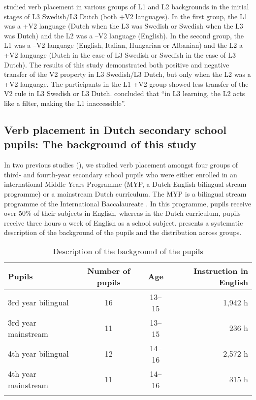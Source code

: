 \documentclass[output=paper]{langsci/langscibook}
\begin{document}
\citet{BardelFalk2007} studied verb placement in various groups of L1 and L2 backgrounds in the initial stages of L3 Swedish/L3 Dutch (both +V2 languages). In the first group, the L1 was a +V2 language (Dutch when the L3 was Swedish or Swedish when the L3 was Dutch) and the L2 was a –V2 language (English). In the second group, the L1 was a –V2 language (English, Italian, Hungarian or Albanian) and the L2 a +V2 language (Dutch in the case of L3 Swedish or Swedish in the case of L3 Dutch). The results of this study demonstrated both positive and negative transfer of the V2 property in L3 Swedish/L3 Dutch, but only when the L2 was a +V2 language. The participants in the L1 +V2 group showed less transfer of the V2 rule in L3 Swedish or L3 Dutch. \citet[480]{BardelFalk2007} concluded that “in L3 learning, the L2 acts like a filter, making the L1 inaccessible”.

\subsection{{Verb} {placement} {in} {Dutch} {secondary} {school} {pupils:} {The} {background} {of} {this} {study}}%
\label{sec:stadt:2.3}

In two previous studies (\citealt{StadtEtAl2016, StadtEtAl2018Exposure}), we studied verb placement amongst four groups of third- and fourth-year secondary school pupils who were either enrolled in an international Middle Years Programme (MYP, a Dutch-English bilingual stream programme) or a mainstream Dutch curriculum. The MYP is a bilingual stream programme of the International Baccalaureate \citep{IBO2019}. In this programme, pupils receive over 50\% of their subjects in English, whereas in the Dutch curriculum, pupils receive three hours a week of English as a school subject.  presents a systematic description of the background of the pupils and the distribution across groups.

\begin{table}
\caption{Description of the background of the pupils\label{tab:stadt:1}}
\begin{tabular}{l c c r}
\lsptoprule
Pupils &  Number of pupils & Age & Instruction in English\\
	\midrule
3rd year bilingual &  16 & 13--15 & 1,942 h\\
3rd year mainstream &  11 & 13--15 & 236 h\\
4th year bilingual &   12 & 14--16 & 2,572 h\\
4th year mainstream &  11 & 14--16 & 315 h\\
\lspbottomrule
\end{tabular}
\end{table}
\end{document}
